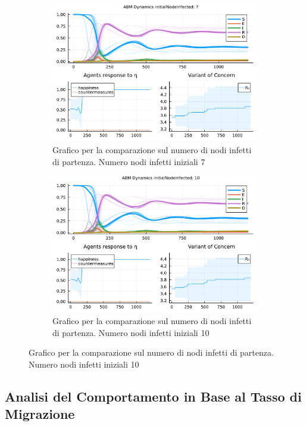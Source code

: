 \begin{figure}[!hb]
\begin{subfigure}[b]{0.45\textwidth}
		\includegraphics[width=\textwidth]{img/SocialNetworkABM_3_II.pdf}
		\caption{Grafico per la comparazione sul numero di nodi infetti di partenza. Numero nodi infetti iniziali 7}
		\label{fig:comparison_init_node_inf_7}
	\end{subfigure}
	\hfill
	\begin{subfigure}[b]{0.45\textwidth}
		\centering
		\includegraphics[width=\textwidth]{img/SocialNetworkABM_4_II.pdf}
		\caption{Grafico per la comparazione sul numero di nodi infetti di partenza. Numero nodi infetti iniziali 10}
		\label{fig:comparison_init_node_inf_10}
	\end{subfigure}
\end{figure}
\newpage

\subsection{Analisi del Comportamento in Base al Tasso di Migrazione}

